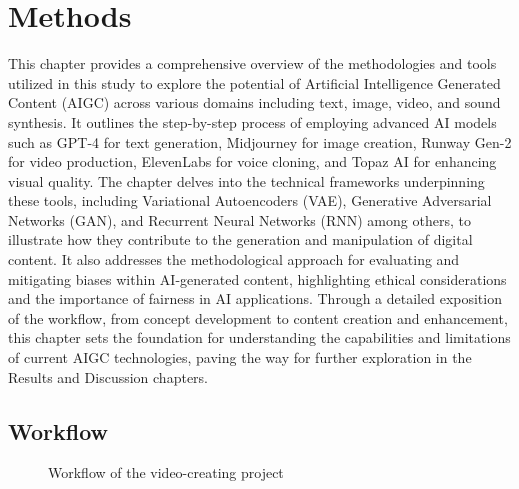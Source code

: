 \documentclass[11pt,a4paper,oneside]{report}
\begin{document}
\chapter{Methods}

This chapter provides a comprehensive overview of the methodologies and tools utilized in this study to explore the potential of Artificial Intelligence Generated Content (AIGC) across various domains including text, image, video, and sound synthesis. 
It outlines the step-by-step process of employing advanced AI models such as GPT-4 for text generation, Midjourney for image creation, Runway Gen-2 for video production, ElevenLabs for voice cloning, and Topaz AI for enhancing visual quality. 
The chapter delves into the technical frameworks underpinning these tools, including Variational Autoencoders (VAE), Generative Adversarial Networks (GAN), and Recurrent Neural Networks (RNN) among others, to illustrate how they contribute to the generation and manipulation of digital content. 
It also addresses the methodological approach for evaluating and mitigating biases within AI-generated content, highlighting ethical considerations and the importance of fairness in AI applications. 
Through a detailed exposition of the workflow, from concept development to content creation and enhancement, this chapter sets the foundation for understanding the capabilities and limitations of current AIGC technologies, paving the way for further exploration in the Results and Discussion chapters.

\section{Workflow}

\begin{figure}[H]
\centering
{}
\caption{Workflow of the video-creating project}
\end{figure}
\end{document}
